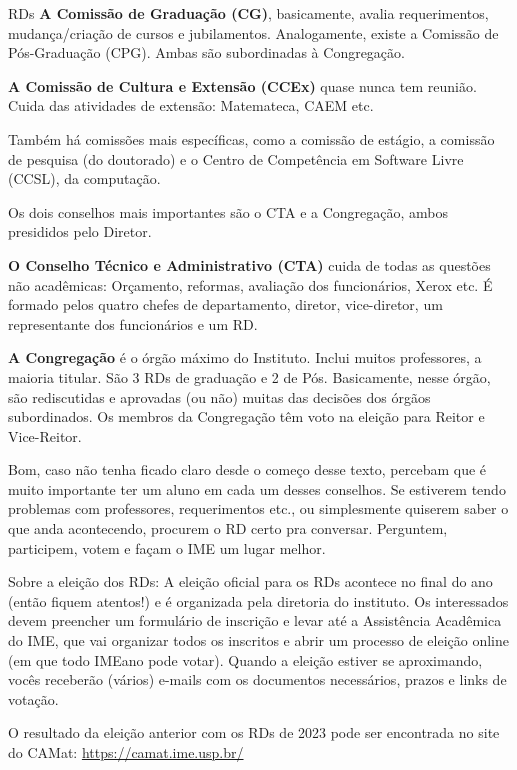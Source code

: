 \begin{subsecao}{RDs}
{\bf A Comissão de Graduação (CG)}, basicamente, avalia requerimentos,
mudança/criação de cursos e jubilamentos. Analogamente, existe a Comissão de
Pós-Graduação (CPG). Ambas são subordinadas à Congregação.

{\bf A Comissão de Cultura e Extensão (CCEx)} quase nunca tem reunião. Cuida
das atividades de extensão: Matemateca, CAEM etc.

Também há comissões mais específicas, como a comissão de estágio, a comissão de
pesquisa (do doutorado) e o Centro de Competência em Software Livre (CCSL), da
computação.

Os dois conselhos mais importantes são o CTA e a Congregação, ambos presididos
pelo Diretor.

{\bf O Conselho Técnico e Administrativo (CTA)} cuida de todas as questões não
acadêmicas: Orçamento, reformas, avaliação dos funcionários, Xerox etc. É
formado pelos quatro chefes de departamento, diretor, vice-diretor, um
representante dos funcionários e um RD.

{\bf A Congregação} é o órgão máximo do Instituto. Inclui muitos professores, a
maioria titular. São 3 RDs de graduação e 2 de Pós. Basicamente,
nesse órgão, são rediscutidas e aprovadas (ou não) muitas das decisões
dos órgãos subordinados. Os membros da Congregação têm voto na eleição para
Reitor e Vice-Reitor.

Bom, caso não tenha ficado claro desde o começo desse texto, percebam que é
muito importante ter um aluno em cada um desses conselhos. Se estiverem tendo
problemas com professores, requerimentos etc., ou simplesmente quiserem saber
o que anda acontecendo, procurem o RD certo pra conversar. Perguntem,
participem, votem e façam o IME um lugar melhor.

Sobre a eleição dos RDs: A eleição oficial para os RDs acontece no final do ano
(então fiquem atentos!) e é organizada pela diretoria do instituto. Os
interessados devem preencher um formulário de inscrição e levar até a
Assistência Acadêmica do IME, que vai organizar todos os inscritos e abrir um
processo de eleição online (em que todo IMEano pode votar). Quando a eleição
estiver se aproximando, vocês receberão (vários) e-mails com os documentos
necessários, prazos e links de votação.

O resultado da eleição anterior com os RDs de 2023 pode ser encontrada no site
do CAMat:
\url{https://camat.ime.usp.br/}


\end{subsecao}
